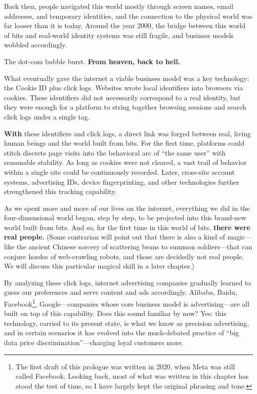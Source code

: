 Back then, people navigated this world mostly through screen names, email addresses, and temporary identities, and the connection to the physical world was far looser than it is today. Around the year 2000, the bridge between this world of bits and real-world identity systems was still fragile, and business models wobbled accordingly.

\vspace{1em}

The dot-com bubble burst. \textbf{From heaven, back to hell.}

What eventually gave the internet a viable business model was a key technology: the Cookie ID plus click logs. Websites wrote local identifiers into browsers via cookies. These identifiers did not necessarily correspond to a real identity, but they were enough for a platform to string together browsing sessions and search click logs under a single tag.

\textbf{With} these identifiers and click logs, a direct link was forged between real, living human beings and the world built from bits.
For the first time, platforms could stitch discrete page visits into the behavioral arc of ``the same user'' with reasonable stability. As long as cookies were not cleared, a vast trail of behavior within a single site could be continuously recorded. Later, cross-site account systems, advertising IDs, device fingerprinting, and other technologies further strengthened this tracking capability.

\vspace{1em}

As we spent more and more of our lives on the internet, everything we did in the four-dimensional world began, step by step, to be projected into this brand-new world built from bits. And so, for the first time in this world of bits, \textbf{there were real people.}
{\kaiti (Some contrarian will point out that there is also a kind of magic---like the ancient Chinese sorcery of scattering beans to summon soldiers---that can conjure hordes of web-crawling robots, and those are decidedly not real people. We will discuss this particular magical skill in a later chapter.)}

\vspace{1em}

By analyzing these click logs, internet advertising companies gradually learned to guess our preferences and serve content and ads accordingly. Alibaba, Baidu, Facebook\footnote{The first draft of this prologue was written in 2020, when Meta was still called Facebook. Looking back, most of what was written in this chapter has stood the test of time, so I have largely kept the original phrasing and tone.}, Google---companies whose core business model is advertising---are all built on top of this capability. Does this sound familiar by now? Yes: this technology, carried to its present state, is what we know as precision advertising, and in certain scenarios it has evolved into the much-debated practice of ``big data price discrimination''---charging loyal customers more.

